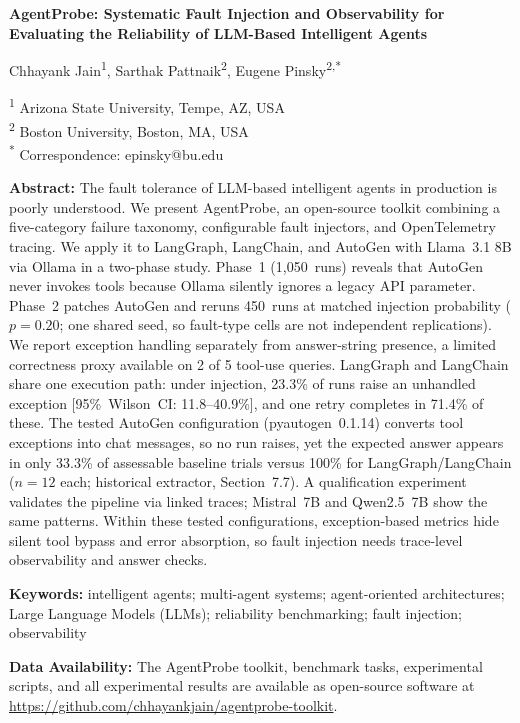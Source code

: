 \documentclass[12pt,a4paper]{article}
\begin{document}
\begin{center}
{\Large\bfseries AgentProbe: Systematic Fault Injection and Observability for Evaluating the Reliability of LLM-Based Intelligent Agents}

\vspace{1em}

{\large Chhayank Jain\textsuperscript{1}, Sarthak Pattnaik\textsuperscript{2}, Eugene Pinsky\textsuperscript{2,*}}

\vspace{0.5em}

\textsuperscript{1} Arizona State University, Tempe, AZ, USA\\
\textsuperscript{2} Boston University, Boston, MA, USA\\[0.3em]
\textsuperscript{*} Correspondence: epinsky@bu.edu
\end{center}

\vspace{1.5em}

\noindent\textbf{Abstract:}
The fault tolerance of LLM-based intelligent agents in production is poorly understood. We present AgentProbe, an open-source toolkit combining a five-category failure taxonomy, configurable fault injectors, and OpenTelemetry tracing. We apply it to LangGraph, LangChain, and AutoGen with Llama~3.1 8B via Ollama in a two-phase study. Phase~1 (1,050~runs) reveals that AutoGen never invokes tools because Ollama silently ignores a legacy API parameter. Phase~2 patches AutoGen and reruns 450~runs at matched injection probability ($p = 0.20$; one shared seed, so fault-type cells are not independent replications). We report exception handling separately from answer-string presence, a limited correctness proxy available on 2 of 5 tool-use queries. LangGraph and LangChain share one execution path: under injection, 23.3\% of runs raise an unhandled exception [95\%~Wilson~CI: 11.8--40.9\%], and one retry completes in 71.4\% of these. The tested AutoGen configuration (pyautogen~0.1.14) converts tool exceptions into chat messages, so no run raises, yet the expected answer appears in only 33.3\% of assessable baseline trials versus 100\% for LangGraph/LangChain ($n = 12$ each; historical extractor, Section~7.7). A qualification experiment validates the pipeline via linked traces; Mistral~7B and Qwen2.5~7B show the same patterns. Within these tested configurations, exception-based metrics hide silent tool bypass and error absorption, so fault injection needs trace-level observability and answer checks.

\vspace{1em}

\noindent\textbf{Keywords:} intelligent agents; multi-agent systems; agent-oriented architectures; Large Language Models (LLMs); reliability benchmarking; fault injection; observability

\vspace{1.5em}

{\noindent\textbf{Data Availability:} The AgentProbe toolkit, benchmark tasks, experimental scripts, and all experimental results are available as open-source software at\\\url{https://github.com/chhayankjain/agentprobe-toolkit}.}
\end{document}
